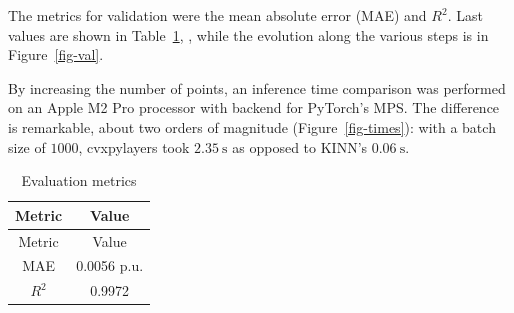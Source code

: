 \documentclass[
]{article}
\begin{document}
The metrics for validation were the mean absolute error (MAE) and
\(R^2\). Last values are shown in Table~\ref{tbl-eval}, , while the
evolution along the various steps is in Figure~\ref{fig-val}.

By increasing the number of points, an inference time comparison was
performed on an Apple M2 Pro processor with backend for PyTorch's MPS.
The difference is remarkable, about two orders of magnitude
(Figure~\ref{fig-times}): with a batch size of \(1000\), cvxpylayers
took \(2.35~\textrm{s}\) as opposed to KINN's \(0.06~\textrm{s}\).

\begin{longtable}[]{@{}cc@{}}
\caption{Evaluation metrics}\label{tbl-eval}\tabularnewline
\toprule\noalign{}
Metric & Value \\
\midrule\noalign{}
\endfirsthead
\toprule\noalign{}
Metric & Value \\
\midrule\noalign{}
\endhead
\bottomrule\noalign{}
\endlastfoot
MAE & 0.0056 p.u. \\
\(R^{2}\) & 0.9972 \\
\end{longtable}
\end{document}
